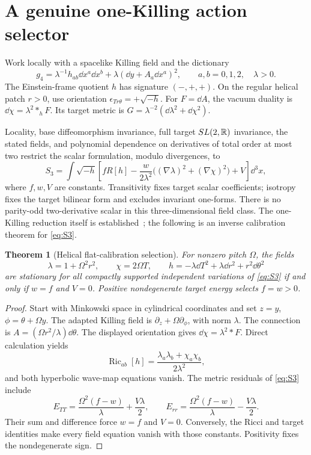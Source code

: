 \documentclass[11pt]{article}
\newtheorem{theorem}{Theorem}[section]\newtheorem{proposition}[theorem]{Proposition}
\begin{document}
\section{A genuine one-Killing action selector}
Work locally with a spacelike Killing field and the dictionary
\begin{equation}\label{eq:KK}
g_4=\lambda^{-1}h_{ab}\dd x^a\dd x^b
+\lambda(\dd y+A_a\dd x^a)^2,\qquad a,b=0,1,2,\quad\lambda>0.
\end{equation}
The Einstein-frame quotient $h$ has signature $(-,+,+)$. On the regular helical patch $r>0$, use orientation $\epsilon_{Tr\theta}=+\sqrt{-h}$. For $F=\dd A$, the vacuum duality is $\dd\chi=\lambda^2 *_hF$. Its target metric is $G=\lambda^{-2}(\dd\lambda^2+\dd\chi^2)$.

Locality, base diffeomorphism invariance, full target $SL(2,\mathbb R)$ invariance, the stated fields, and polynomial dependence on derivatives of total order at most two restrict the scalar formulation, modulo divergences, to
\begin{equation}\label{eq:S3}
S_3=\int\sqrt{-h}\left[fR[h]-\frac w{2\lambda^2}\big((\nabla\lambda)^2+(\nabla\chi)^2\big)+V\right]\dd^3x,
\end{equation}
where $f,w,V$ are constants. Transitivity fixes target scalar coefficients; isotropy fixes the target bilinear form and excludes invariant one-forms. There is no parity-odd two-derivative scalar in this three-dimensional field class. The one-Killing reduction itself is established~\cite{Moncrief,GerochGroup}; the following is an inverse calibration theorem for \eqref{eq:S3}.

\begin{theorem}[Helical flat-calibration selection]\label{thm:helical}
For nonzero pitch $\Omega$, the fields
\begin{equation}\label{eq:helical}
\lambda=1+\Omega^2r^2,\qquad \chi=2\Omega T,\qquad
h=-\lambda\dd T^2+\lambda\dd r^2+r^2\dd\theta^2
\end{equation}
are stationary for all compactly supported independent variations of \eqref{eq:S3} if and only if $w=f$ and $V=0$. Positive nondegenerate target energy selects $f=w>0$.
\end{theorem}
\begin{proof}
Start with Minkowski space in cylindrical coordinates and set $z=y$, $\phi=\theta+\Omega y$. The adapted Killing field is $\partial_z+\Omega\partial_\phi$, with norm $\lambda$. The connection is $A=(\Omega r^2/\lambda)\dd\theta$. The displayed orientation gives $\dd\chi=\lambda^2*F$. Direct calculation yields
\[
\operatorname{Ric}_{ab}[h]=\frac{\lambda_a\lambda_b+\chi_a\chi_b}{2\lambda^2},
\]
and both hyperbolic wave-map equations vanish. The metric residuals of \eqref{eq:S3} include
\begin{equation}\label{eq:helres}
E_{TT}=\frac{\Omega^2(f-w)}\lambda+\frac{V\lambda}{2},\qquad
E_{rr}=\frac{\Omega^2(f-w)}\lambda-\frac{V\lambda}{2}.
\end{equation}
Their sum and difference force $w=f$ and $V=0$. Conversely, the Ricci and target identities make every field equation vanish with those constants. Positivity fixes the nondegenerate sign.
\end{proof}
\end{document}
